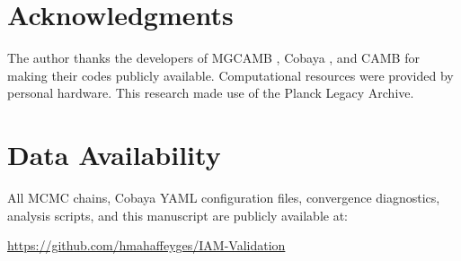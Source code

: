 \documentclass[11pt]{article}
\begin{document}
\section*{Acknowledgments}

The author thanks the developers of MGCAMB \citep{MGCAMB}, Cobaya \citep{Cobaya}, and CAMB \citep{CAMB} for making their codes publicly available.
Computational resources were provided by personal hardware.
This research made use of the Planck Legacy Archive.


\section*{Data Availability}

All MCMC chains, Cobaya YAML configuration files, convergence diagnostics, analysis scripts, and this manuscript are publicly available at:

\url{https://github.com/hmahaffeyges/IAM-Validation}


\end{document}
